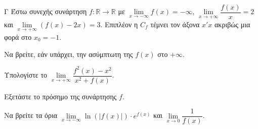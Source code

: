 \begin{thema}{Γ}
Έστω συνεχής συνάρτηση $f: \mathbb{R} \to \mathbb{R}$ με $\lim\limits_{x \to -\infty} f(x) = -\infty$, $\lim\limits_{x \to +\infty} \dfrac{f(x)}{x} = 2$ και $\lim\limits_{x \to +\infty} (f(x) - 2x) = 3$. Επιπλέον η $C_f$ τέμνει τον άξονα $x'x$ ακριβώς μια φορά στο $x_0 = -1$.
\begin{erwthma}
  \item Να βρείτε, εάν υπάρχει, την ασύμπτωτη της $f(x)$ στο $+\infty$. 
  \item Υπολογίστε το $\lim\limits_{x \to +\infty} \dfrac{f^2(x) - x^2}{x^2 + f(x)}$.
  \item Εξετάστε το πρόσημο της συνάρτησης $f$.
  \item Να βρείτε τα όρια $\lim\limits_{x \to -\infty} \ln(|f(x)|) \cdot e^{f(x)}$ και $\lim\limits_{x \to 0} \dfrac{1}{f(x)}$.
\end{erwthma}
\end{thema}
